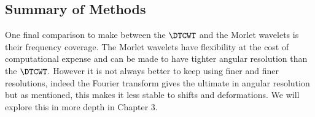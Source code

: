 

\subsection{Summary of Methods}
  One final comparison to make between the $\DTCWT$ and the Morlet wavelets is
  their frequency coverage. The Morlet wavelets have flexibility at the cost of
  computational expense and can be made to have tighter angular resolution than
  the $\DTCWT$. However it is not always
  better to keep using finer and finer resolutions, indeed the Fourier
  transform gives the ultimate in angular resolution but as mentioned, this
  makes it less stable to shifts and deformations. We will explore this in more
  depth in Chapter 3.

